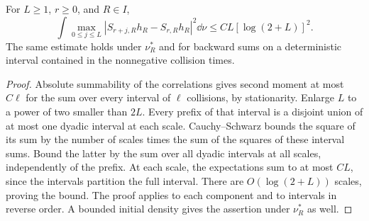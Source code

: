 \begin{lemma}
\label{lem:dyadic-collision-maximal}
For $L\ge1$, $r\ge0$, and $R\in I$,
\begin{equation}\label{eq:dyadic-collision-maximal}
 \int\max_{0\le j\le L}
 |S_{r+j,R}h_R-S_{r,R}h_R|^2\dd\nu
       \le CL[\log(2+L)]^2.
\end{equation}
The same estimate holds under $\nu_R^*$ and for backward sums on a
deterministic interval contained in the nonnegative collision times.
\end{lemma}
\begin{proof}
Absolute summability of the correlations gives second moment at most
$C\ell$ for the sum over every interval of $\ell$ collisions, by
stationarity. Enlarge $L$ to a power of two smaller than $2L$.
Every prefix of that interval is a disjoint union of at most one dyadic
interval at each scale. Cauchy--Schwarz bounds the square of its sum by
the number of scales times the sum of the squares of these interval
sums. Bound the latter by the sum over all dyadic intervals at all
scales, independently of the prefix. At each scale, the expectations
sum to at most $CL$, since the intervals partition the full interval.
There are $O(\log(2+L))$ scales, proving the bound. The proof applies
to each component and to intervals in reverse order. A bounded initial
density gives the assertion under $\nu_R^*$ as well.
\end{proof}


